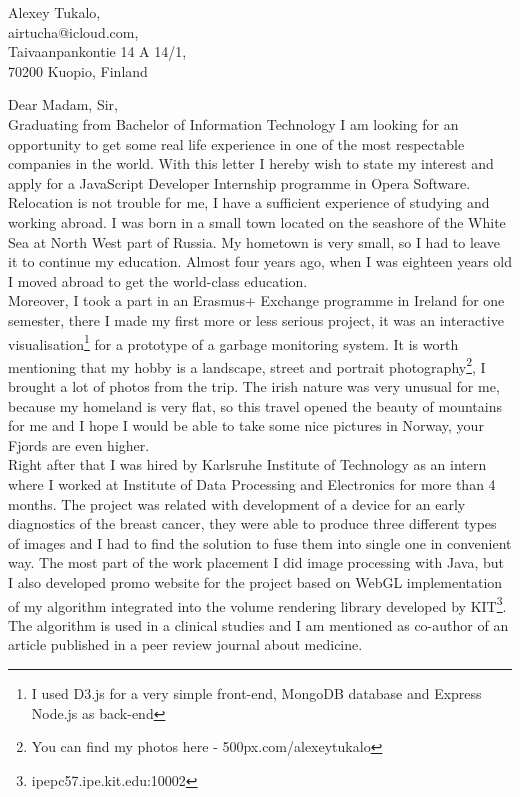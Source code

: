 \documentclass[english]{article}
\date{}
\begin{document}
\begin{flushright}
Alexey Tukalo,\\
airtucha@icloud.com,\\
Taivaanpankontie 14 A 14/1,\\
70200 Kuopio, Finland
\end{flushright}

Dear Madam, Sir,\\ 

Graduating from Bachelor of Information Technology I am looking for an opportunity to get some real life experience in one of the most respectable companies in the world. With this letter I hereby wish to state my interest and apply for a JavaScript Developer Internship programme in Opera Software.\\

Relocation is not trouble for me, I have a sufficient experience of studying and working abroad. I was born in a small town located on the seashore of the White Sea at North West part of Russia. My hometown is very small, so I had to leave it to continue my education. Almost four years ago, when I was eighteen years old I moved abroad to get the world-class education.\\

Moreover, I took a part in an Erasmus+ Exchange programme in Ireland for one semester, there I made my first more or less serious project, it was an interactive visualisation\footnote{I used D3.js for a very simple front-end, MongoDB database and Express Node.js as back-end} for a prototype of a garbage monitoring system. It is worth mentioning that my hobby is a landscape, street and portrait photography\footnote{You can find my photos here - 500px.com/alexeytukalo}, I brought a lot of photos from the trip. The irish nature was very unusual for me, because my homeland is very flat, so this travel opened the beauty of mountains for me and I hope I would be able to take some nice pictures in Norway, your Fjords are even higher.\\

Right after that I was hired by Karlsruhe Institute of Technology as an intern where I worked at Institute of Data Processing and Electronics for more than 4 months. The project was related with development of a device for an early diagnostics of the breast cancer, they were able to produce three different types of images and I had to find the solution to fuse them into single one in convenient way. The most part of the work placement I did image processing with Java, but I also developed promo website for the project based on WebGL implementation of my algorithm integrated into the volume rendering library developed by KIT\footnote{ipepc57.ipe.kit.edu:10002}. The algorithm is used in a clinical studies and I am mentioned as co-author of an article published in a peer review journal about medicine.\\
\end{document}
